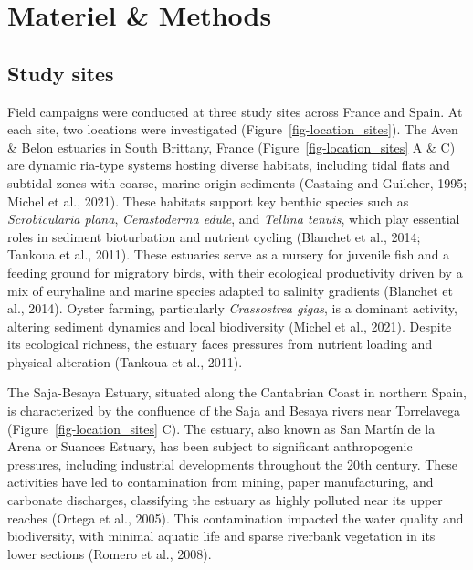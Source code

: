 \documentclass[
  letterpaper,
  DIV=11,
  numbers=noendperiod]{scrartcl}
\begin{document}
\section{Materiel \& Methods}\label{materiel-methods}

\subsection{Study sites}\label{study-sites}

Field campaigns were conducted at three study sites across France and
Spain. At each site, two locations were investigated
(Figure~\ref{fig-location_sites}). The Aven \& Belon estuaries in South
Brittany, France (Figure~\ref{fig-location_sites} A \& C) are dynamic
ria-type systems hosting diverse habitats, including tidal flats and
subtidal zones with coarse, marine-origin sediments (Castaing and
Guilcher, 1995; Michel et al., 2021). These habitats support key benthic
species such as \emph{Scrobicularia plana}, \emph{Cerastoderma edule},
and \emph{Tellina tenuis}, which play essential roles in sediment
bioturbation and nutrient cycling (Blanchet et al., 2014; Tankoua et
al., 2011). These estuaries serve as a nursery for juvenile fish and a
feeding ground for migratory birds, with their ecological productivity
driven by a mix of euryhaline and marine species adapted to salinity
gradients (Blanchet et al., 2014). Oyster farming, particularly
\emph{Crassostrea gigas}, is a dominant activity, altering sediment
dynamics and local biodiversity (Michel et al., 2021). Despite its
ecological richness, the estuary faces pressures from nutrient loading
and physical alteration (Tankoua et al., 2011).

The Saja-Besaya Estuary, situated along the Cantabrian Coast in northern
Spain, is characterized by the confluence of the Saja and Besaya rivers
near Torrelavega (Figure~\ref{fig-location_sites} C). The estuary, also
known as San Martín de la Arena or Suances Estuary, has been subject to
significant anthropogenic pressures, including industrial developments
throughout the 20th century. These activities have led to contamination
from mining, paper manufacturing, and carbonate discharges, classifying
the estuary as highly polluted near its upper reaches (Ortega et al.,
2005). This contamination impacted the water quality and biodiversity,
with minimal aquatic life and sparse riverbank vegetation in its lower
sections (Romero et al., 2008).
\end{document}

